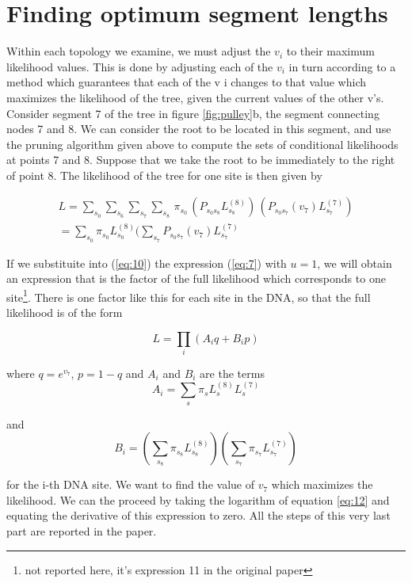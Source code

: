 \section{Finding optimum segment lengths}
Within each topology we examine, we must adjust the $v_i$ to their maximum likelihood values. 
This is done by adjusting each of the $v_i$ in turn according to a method which guarantees that each of the v i changes to that value which maximizes the likelihood of the tree, given the current values of the other v's.
Consider segment 7 of the tree in figure \ref{fig:pulley}b, the segment connecting nodes 7 and 8. We can consider the root to be located in this segment, and use the pruning algorithm given above to compute the sets of conditional likelihoods at points 7 and 8. Suppose that we take the root to be immediately to the right of point 8. The likelihood of the tree for one site is then given by

\begin{align}\label{eq:10}
L = \sum_{s_0} \sum_{s_6} \sum_{s_7} \sum_{s_8} \, \pi_{s_0} \, (P_{s_0 s_8} L_{s_8}^{(8)}) \, (P_{s_0 s_7}(v_7) L_{s_7}^{(7)}) 
\\
= \sum_{s_0} \pi_{s_0} L_{s_0}^{(8)} ( \sum_{s_7} P_{s_0 s_7}(v_7) L_{s_7}^{(7)}
\end{align}

If we substituite into (\ref{eq:10}) the expression (\ref{eq:7}) with $u=1$, we will obtain an expression that is the factor of the full likelihood which corresponds to one site\footnote{not reported here, it's expression 11 in the original paper}. There is one factor like this for each site in the DNA, so that the full likelihood is of the form

\begin{equation}\label{eq:12}
L = \prod_{i} (A_i q + B_ip)
\end{equation}

where $q= e^{v_7}$, $p= 1-q$ and $A_i$ and $B_i$ are the terms 
\begin{equation}
A_i = \sum_{s} \pi_s L_s ^{(8)} L_s ^{(7)}
\end{equation}

and 
 \begin{equation}
 B_i = (\sum_{s_8} \pi_{s_8} L_{s_8} ^{(8)}) (\sum_{s_7} \pi_{s_7} L_{s_7} ^{(7)})
 \end{equation}

for the i-th DNA site. We want to find the value of $v_7$ which maximizes the likelihood. We can the proceed by taking the logarithm of equation \ref{eq:12} and equating the derivative of this expression to zero. All the steps of this very last part are reported in the paper. 




















